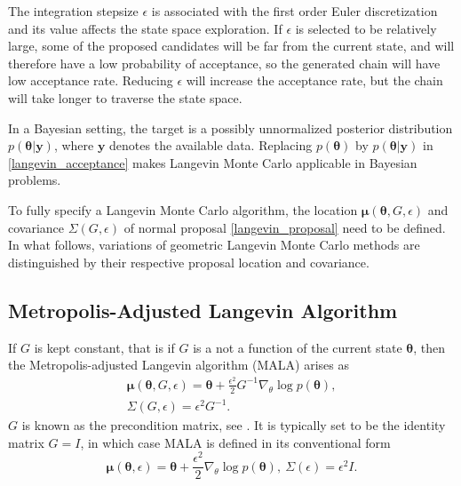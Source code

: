 \documentclass[twoside,11pt]{article}
\begin{document}
The integration stepsize $\epsilon$ is associated with the first order Euler discretization and its value affects the
state space exploration. If $\epsilon$ is selected to be relatively large, some of the proposed candidates will be far from 
the current state, and will therefore have a low probability of acceptance, so the generated chain will have low acceptance 
rate. Reducing $\epsilon$ will increase the acceptance rate, but the chain will take longer to traverse the state space.

In a Bayesian setting, the target is a possibly unnormalized posterior distribution $p(\boldsymbol{\theta}|\mathbf{y})$,
where $\mathbf{y}$ denotes the available data. Replacing $p(\boldsymbol{\theta})$ by $p(\boldsymbol{\theta}|\mathbf{y})$ in
\eqref{langevin_acceptance} makes Langevin Monte Carlo applicable in Bayesian problems.

To fully specify a Langevin Monte Carlo algorithm, the location $\boldsymbol{\mu}(\boldsymbol{\theta}, G, \epsilon)$ and 
covariance $\Sigma(G, \epsilon)$ of normal proposal \eqref{langevin_proposal} need to be defined. In what follows, 
variations of geometric Langevin Monte Carlo methods are distinguished by their respective proposal location and covariance.

\subsection{Metropolis-Adjusted Langevin Algorithm}
\label{mala_section}

If $G$ is kept constant, that is if $G$ is a not a function of the current state $\boldsymbol{\theta}$, then the
Metropolis-adjusted Langevin algorithm (MALA) arises as
\begin{eqnarray}
\label{mala_location}
\boldsymbol{\mu}(\boldsymbol{\theta}, G, \epsilon) = 
\boldsymbol{\theta}+\frac{\epsilon^2}{2}G^{-1}\nabla_{\theta}\log{p(\boldsymbol{\theta})},\\
\label{mala_covariance}
\Sigma(G, \epsilon) = \epsilon^2 G^{-1}.
\end{eqnarray}
$G$ is known as the precondition matrix, see \cite{rob_stra__lan}. It is typically set to be the identity matrix $G=I$, in
which case MALA is defined in its conventional form
\begin{equation}
\label{mala_location_covariance_identity}
\boldsymbol{\mu}(\boldsymbol{\theta}, \epsilon) = 
\boldsymbol{\theta}+\frac{\epsilon^2}{2}\nabla_{\theta}\log{p(\boldsymbol{\theta})},~
\Sigma(\epsilon) = \epsilon^2 I.
\end{equation}
\end{document}
